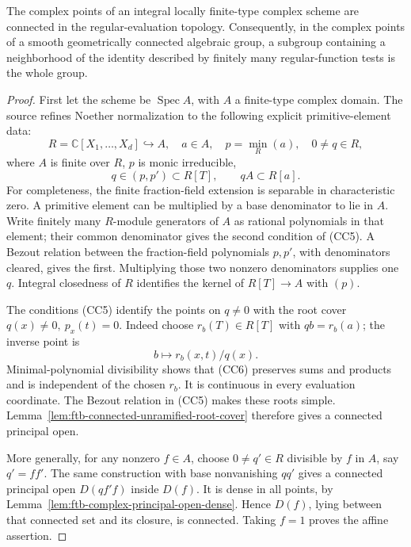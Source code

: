\begin{srproposition}
\label{prop:ftb-integral-complex-points-connected}
The complex points of an integral locally finite-type
complex scheme are connected in the regular-evaluation
topology.
Consequently, in the complex points of a smooth
geometrically connected algebraic group, a subgroup
containing a neighborhood of the identity described by
finitely many regular-function tests is the whole group.
\end{srproposition}
\begin{proof}
First let the scheme be \(\operatorname{Spec}A\), with
\(A\) a finite-type complex domain.
The source refines Noether normalization to the following
explicit primitive-element data:
\[
 R=\mathbb C[X_1,\ldots,X_d]\hookrightarrow A,\quad a\in A,
 \quad p=\min_R(a),\quad0\ne q\in R,                       \tag{CC4}
\]
where \(A\) is finite over \(R\), \(p\) is monic irreducible,
\[
 q\in(p,p')\subset R[T],\qquad
             qA\subset R[a].                            \tag{CC5}
\]
For completeness, the finite fraction-field extension is
separable in characteristic zero.
A primitive element can be multiplied by a base
denominator to lie in \(A\).
Write finitely many \(R\)-module generators of \(A\) as
rational polynomials in that element; their common
denominator gives the second condition of (CC5).
A Bezout relation between the fraction-field polynomials
\(p,p'\), with denominators cleared, gives the first.
Multiplying those two nonzero denominators supplies one \(q\).
Integral closedness of \(R\) identifies the kernel of
\(R[T]\to A\) with \((p)\).

The conditions (CC5) identify the points on \(q\ne0\)
with the root cover \(q(x)\ne0,\ p_x(t)=0\).
Indeed choose \(r_b(T)\in R[T]\) with \(qb=r_b(a)\);
the inverse point is
\[
                            b\longmapsto r_b(x,t)/q(x).
                                                               \tag{CC6}
\]
Minimal-polynomial divisibility shows that (CC6)
preserves sums and products and is independent of the
chosen \(r_b\).
It is continuous in every evaluation coordinate.
The Bezout relation in (CC5) makes these roots simple.
Lemma~\ref{lem:ftb-connected-unramified-root-cover}
therefore gives a connected principal open.

More generally, for any nonzero \(f\in A\), choose
\(0\ne q'\in R\) divisible by \(f\) in \(A\), say \(q'=ff'\).
The same construction with base nonvanishing \(qq'\)
gives a connected principal open \(D(qf'f)\) inside \(D(f)\).
It is dense in all points, by
Lemma~\ref{lem:ftb-complex-principal-open-dense}.
Hence \(D(f)\), lying between that connected set and its
closure, is connected.
Taking \(f=1\) proves the affine assertion.


\end{proof}
